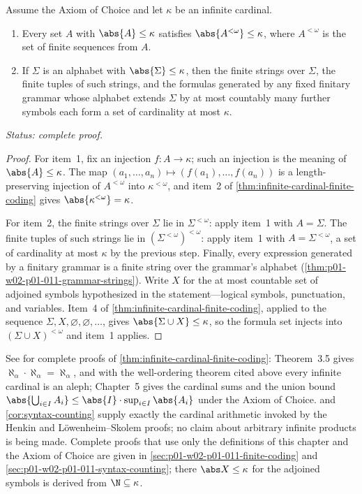 \begin{corollary}
\label{cor:syntax-counting}
Assume the Axiom of Choice and let \(\kappa\) be an infinite cardinal.
\begin{enumerate}
  \item Every set \(A\) with \(\abs{A}\leq\kappa\) satisfies
        \(\abs{A^{<\omega}}\leq\kappa\), where \(A^{<\omega}\) is the set of
        finite sequences from \(A\).
  \item If \(\Sigma\) is an alphabet with \(\abs{\Sigma}\leq\kappa\), then
        the finite strings over \(\Sigma\), the finite tuples of such
        strings, and the formulas generated by any fixed finitary grammar
        whose alphabet extends \(\Sigma\) by at most countably many further
        symbols each form a set of cardinality at most \(\kappa\).
\end{enumerate}
\textit{Status: complete proof.}
\end{corollary}

\begin{proof}
For item~1, fix an injection \(f:A\to\kappa\); such an injection is the
meaning of \(\abs{A}\leq\kappa\).  The map
\((a_1,\ldots,a_n)\mapsto(f(a_1),\ldots,f(a_n))\) is a length-preserving
injection of \(A^{<\omega}\) into \(\kappa^{<\omega}\), and item~2 of
\cref{thm:infinite-cardinal-finite-coding} gives
\(\abs{\kappa^{<\omega}}=\kappa\).

For item~2, the finite strings over \(\Sigma\) lie in \(\Sigma^{<\omega}\):
apply item~1 with \(A=\Sigma\).  The finite tuples of such strings lie in
\((\Sigma^{<\omega})^{<\omega}\): apply item~1 with \(A=\Sigma^{<\omega}\),
a set of cardinality at most \(\kappa\) by the previous step.  Finally,
every expression generated by a finitary grammar is a finite string over the
grammar's alphabet (\cref{thm:p01-w02-p01-011-grammar-strings}).
Write \(X\) for the at most countable set of adjoined symbols hypothesized
in the statement---logical symbols, punctuation, and variables.  Item~4 of
\cref{thm:infinite-cardinal-finite-coding}, applied to the sequence
\(\Sigma,X,\varnothing,\varnothing,\ldots\), gives
\(\abs{\Sigma\cup X}\leq\kappa\), so the formula set injects into
\((\Sigma\cup X)^{<\omega}\) and item~1 applies.
\end{proof}

See \cite[Theorem~3.5 and Chapter~5]{Jech2003} for complete proofs of
\cref{thm:infinite-cardinal-finite-coding}: Theorem~3.5 gives
\(\aleph_\alpha\cdot\aleph_\alpha=\aleph_\alpha\), and with the
well-ordering theorem cited above every infinite cardinal is an aleph;
Chapter~5 gives the cardinal sums and the union bound
\(\abs{\bigcup_{i\in I}A_i}\leq\abs{I}\cdot\sup_{i\in I}\abs{A_i}\) under
the Axiom of Choice.  
and \cref{cor:syntax-counting} supply exactly the cardinal arithmetic
invoked by the Henkin and L\"owenheim--Skolem proofs; no claim about
arbitrary infinite products is being made.  Complete proofs that use only the definitions
of this chapter and the Axiom of Choice are given in \cref{sec:p01-w02-p01-011-finite-coding} and
\cref{sec:p01-w02-p01-011-syntax-counting}; there \(\abs X\leq\kappa\) for
the adjoined symbols is derived from \(\N\subseteq\kappa\).

